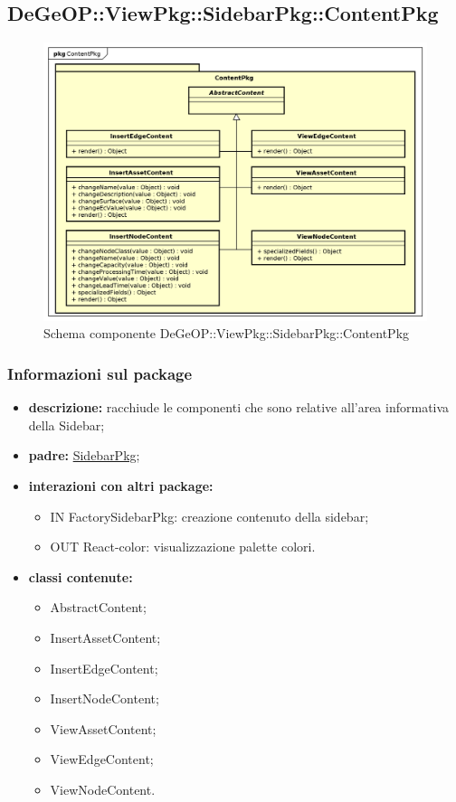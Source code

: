 \subsection{DeGeOP::ViewPkg::SidebarPkg::ContentPkg}
\label{pkg::ContentPkg}
\begin{figure}[H]
	\centering
	\includegraphics[width=\textwidth]{img/PkgDiagram/ContentPkg.png}
	\caption{Schema componente DeGeOP::ViewPkg::SidebarPkg::ContentPkg}
\end{figure}
\subsubsection{Informazioni sul package}
\begin{itemize}
	\item \textbf{descrizione:} racchiude le componenti che sono relative all'area informativa della Sidebar;
	\item \textbf{padre:} \hyperref[pkg::SidebarPkg]{SidebarPkg};
	\item \textbf{interazioni con altri package:} 
	\begin{itemize}
		\item IN FactorySidebarPkg: creazione contenuto della sidebar;
		\item OUT React-color: visualizzazione palette colori.
	\end{itemize}
	\item \textbf{classi contenute:}
	\begin{itemize}
		\item AbstractContent;
		\item InsertAssetContent;
		\item InsertEdgeContent;
		\item InsertNodeContent;
		\item ViewAssetContent;
		\item ViewEdgeContent;
		\item ViewNodeContent.
	\end{itemize}
\end{itemize}
